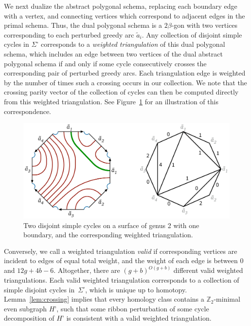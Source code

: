 \documentclass[letterpaper,review]{siamart190516}
\def\Z{\mathbb{Z}}
\begin{document}
We next dualize the abstract polygonal schema, replacing each boundary edge with a vertex, and connecting vertices which correspond to adjacent edges in the primal schema.  Thus, the dual polygonal schema is a $2\beta$-gon with two vertices corresponding to each perturbed greedy arc $\tilde{a}_i$.  Any collection of disjoint simple cycles in $\Sigma^\square$ corresponds to a \emph{weighted triangulation} \cite{ccelw-scsih-08} of this dual polygonal schema, which includes an edge between two vertices of the dual abstract polygonal schema if and only if some cycle consecutively crosses the corresponding pair of perturbed greedy arcs.  Each triangulation edge is weighted by the number of times such a crossing occurs in our collection.  We note that the crossing parity vector of the collection of cycles can then be computed directly from this weighted triangulation.  See Figure~\ref{fig:weightedtriangulation} for an illustration of this correspondence. 

\begin{figure}[htb]
\centering\includegraphics[scale=0.4]{Fig/schema-triangulation}
\caption{Two disjoint simple cycles on a surface of genus 2 with one boundary, and the corresponding weighted triangulation.}
\label{fig:weightedtriangulation}
\end{figure}

Conversely, we call a weighted triangulation \emph{valid} if corresponding vertices are incident to edges of equal total weight, and the weight of each edge is between $0$ and $12g+4b-6$.  Altogether, there are $(g+b)^{O(g+b)}$ different valid weighted triangulations.  Each valid weighted triangulation corresponds to a collection of simple disjoint cycles in~$\Sigma^\square$, which is unique up to homotopy. Lemma~\ref{lem:crossing} implies that every homology class contains a $\Z_2$-minimal even subgraph $H’$, such that some ribbon perturbation of some cycle decomposition of $H’$ is consistent with a valid weighted triangulation.
\end{document}
